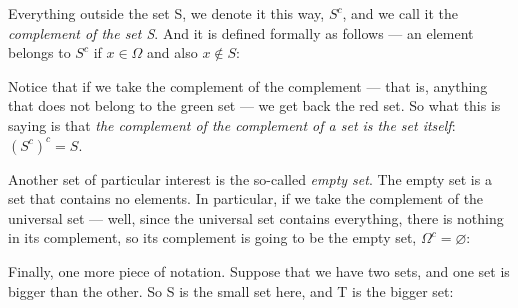 \documentclass[pdftex, brazil, 12pt, twoside]{article}
\begin{document}
Everything outside the set S, we denote it this way, $S^c$, and we
call it the \emph{complement of the set S}. And it is defined
formally as follows ---
an element belongs to $S^c$ if $x \in \Omega$ 
and also $x \notin S$:

\begin{figure}[H]
  \begin{center}
  \end{center}
\end{figure}

Notice that if we take the complement of the complement ---
that is, anything that does not belong to the green set ---
we get back the red set.
So what this is saying is that \emph{the complement of the
complement of a set is the set itself}: $(S^c)^c = S$.

Another set of particular interest is the
so-called \emph{empty set}.
The empty set is a set that contains no elements.
In particular, if we take the complement of
the universal set ---
well, since the universal set contains everything, there is
nothing in its complement, so its complement is going to be
the empty set, $\Omega^c = \varnothing$:

\begin{figure}[H]
  \begin{center}
  \end{center}
\end{figure}

Finally, one more piece of notation.
Suppose that we have two sets, and one set is
bigger than the other.
So S is the small set here, and T is the bigger set:
\end{document}

